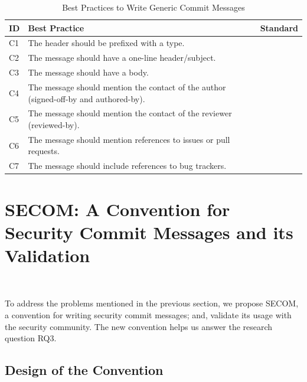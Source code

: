 \begin{table}[t!]
    \footnotesize
    \centering
        \caption{Best Practices to Write Generic Commit Messages} 

    \begin{tabular}{| p{0.25cm} | p{6cm} | p{1.25cm} | }
    \hline
        \textbf{ID} & \textbf{Best Practice} &  \textbf{Standard}
        \\\hline
        C1 &  The header should be prefixed with a type.  & ~\cite{convcom} \\\hline
        C2 & The message should have a one-line header/subject.  & ~\cite{convcom, linus, goodcommit}\\\hline
        
C3 & The message should have a body.  & ~\cite{linus, goodcommit}\\\hline

C4 & The message should mention the contact of the author (signed-off-by and authored-by).  & ~\cite{linus, goodcommit}\\\hline

C5 & The message should mention the contact of the reviewer (reviewed-by).  & ~\cite{linus, goodcommit}\\\hline

C6 & The message should mention references to issues or pull requests.  & ~\cite{goodcommit}\\\hline

C7 & The message should include references to bug trackers.  & ~\cite{goodcommit}\\\hline

    \end{tabular}
    \label{tab:practices}
\end{table}

\section{SECOM: A Convention for Security Commit Messages and its Validation}~\label{sec:solution}

To address the problems mentioned in the previous section, we propose SECOM, a convention for writing security commit messages; and, validate
its usage with the security 
community. The new convention helps us answer the research question RQ3.  


\subsection{Design of the Convention}

